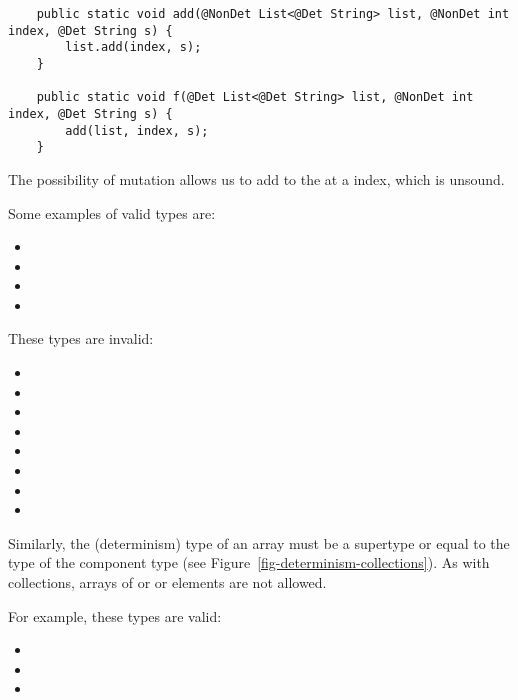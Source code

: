 \begin{Verbatim}
    public static void add(@NonDet List<@Det String> list, @NonDet int index, @Det String s) {
        list.add(index, s);
    }

    public static void f(@Det List<@Det String> list, @NonDet int index, @Det String s) {
        add(list, index, s);
    }
\end{Verbatim}

The possibility of mutation allows us to add to the  at a
 index, which is unsound.

Some examples of valid types are:
\begin{itemize}
    \item {}
    \item {}
    \item {}
    \item {}
\end{itemize}

These types are invalid:
  \begin{itemize}
    \item {}
    \item {}
    \item {}
    \item {}
    \item {}
    \item {}
    \item {}
    \item {}
  \end{itemize}

Similarly, the (determinism) type of an array must be a supertype or equal to
the type of the component type (see Figure~\ref{fig-determinism-collections}).
As with collections,  arrays of  or 
or  elements are not allowed.

For example, these types are valid:
\begin{itemize}
    \item {}
    \item {}
    \item {}
\end{itemize}

